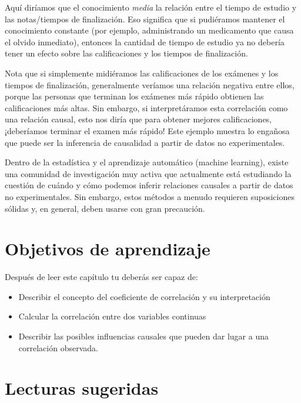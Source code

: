 \documentclass[
  12pt,
]{book}
\providecommand{\tightlist}{%
  \setlength{\itemsep}{0pt}\setlength{\parskip}{0pt}}
\theoremstyle{definition}
\theoremstyle{definition}
\theoremstyle{definition}
\theoremstyle{remark}
\begin{document}
Aquí diríamos que el conocimiento \emph{media} la relación entre el tiempo de estudio y las notas/tiempos de finalización. Eso significa que si pudiéramos mantener el conocimiento constante (por ejemplo, administrando un medicamento que causa el olvido inmediato), entonces la cantidad de tiempo de estudio ya no debería tener un efecto sobre las calificaciones y los tiempos de finalización.

Nota que si simplemente midiéramos las calificaciones de los exámenes y los tiempos de finalización, generalmente veríamos una relación negativa entre ellos, porque las personas que terminan los exámenes más rápido obtienen las calificaciones más altas. Sin embargo, si interpretáramos esta correlación como una relación causal, esto nos diría que para obtener mejores calificaciones, ¡deberíamos terminar el examen más rápido! Este ejemplo muestra lo engañosa que puede ser la inferencia de causalidad a partir de datos no experimentales.

Dentro de la estadística y el aprendizaje automático (machine learning), existe una comunidad de investigación muy activa que actualmente está estudiando la cuestión de cuándo y cómo podemos inferir relaciones causales a partir de datos no experimentales. Sin embargo, estos métodos a menudo requieren suposiciones sólidas y, en general, deben usarse con gran precaución.

\hypertarget{objetivos-de-aprendizaje}{%
\section{Objetivos de aprendizaje}\label{objetivos-de-aprendizaje}}

Después de leer este capítulo tu deberás ser capaz de:

\begin{itemize}
\tightlist
\item
  Describir el concepto del coeficiente de correlación y su interpretación
\item
  Calcular la correlación entre dos variables continuas
\item
  Describir las posibles influencias causales que pueden dar lugar a una correlación observada.
\end{itemize}

\hypertarget{lecturas-sugeridas}{%
\section{Lecturas sugeridas}\label{lecturas-sugeridas}}
\end{document}
